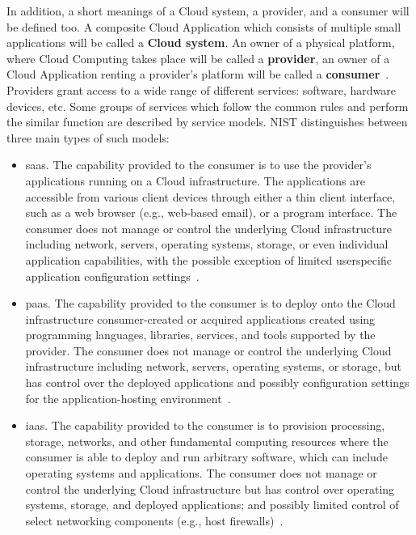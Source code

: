 In addition, a short meanings of a Cloud system, a provider, and a consumer will be defined too.
A composite Cloud Application which consists of multiple small applications will be called a \textbf{Cloud system}\label{def:csys}. %
An owner of a physical platform, where Cloud Computing takes place will be called a \textbf{provider}, an owner of a Cloud Application renting a provider's platform will be called a \textbf{consumer}~\cite{viewCC}.
\\
\label{def:servmod}
Providers grant access to a wide range of different services: software, hardware devices, etc.
Some groups of services which follow the common rules and perform the similar function are described by service models.
NIST distinguishes between three main types of such models:
\begin{itemize}
	\item  \gls{saas}. 
	The capability provided to the consumer is to use the provider’s applications running on a Cloud infrastructure. 
	The applications are accessible from various client devices through either a thin client interface, such as a web browser (e.g., web-based email), or a program interface. 
	The consumer does not manage or control the underlying Cloud infrastructure including network, servers, operating systems, storage, or even individual application capabilities, with the possible exception of limited userspecific application configuration settings~\cite*{nist}.
	\item \gls{paas}. 
	The capability provided to the consumer is to deploy onto the Cloud infrastructure consumer-created or acquired applications created using programming languages, libraries, services, and tools supported by the provider.
	The consumer does not manage or control the underlying Cloud infrastructure including network, servers, operating systems, or storage, but has control over the deployed applications and possibly configuration settings for the application-hosting environment~\cite*{nist}.
	\item \gls{iaas}.
	The capability provided to the consumer is to provision processing, storage, networks, and other fundamental computing resources where the
	consumer is able to deploy and run arbitrary software, which can include operating systems and applications.
	The consumer does not manage or control the underlying Cloud infrastructure but has control over operating systems, storage, and deployed applications; and possibly limited control of select networking components (e.g., host firewalls)~\cite*{nist}.
\end{itemize}

